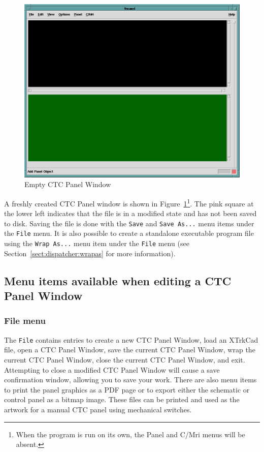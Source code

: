 \begin{figure}[hbpt]
\begin{centering}
\includegraphics[width=5in]{DISPEmptyCTCPanel.png}
\caption{Empty CTC Panel Window}
\label{fig:dispatcher:emptyCTCPanel}
\end{centering}
\end{figure}
A freshly created CTC Panel window is shown in
Figure~\ref{fig:dispatcher:emptyCTCPanel}\footnote{When the program is
run on its own, the Panel and C/Mri menus will be absent.}. The pink
square at the lower left indicates that the file is in a modified state
and has not been saved to disk.  Saving the file is done with the
\verb=Save= and \verb=Save As...= menu items under the \verb=File= menu.
It is also possible to create a standalone executable program file using
the \verb=Wrap As...= menu item under the \verb=File= menu (see
Section~\ref{sect:dispatcher:wrapas} for more information).

\subsection{Menu items available when editing a CTC Panel Window}

\subsubsection{File menu}

The \verb=File= contains entries to create a new CTC Panel Window, load
an XTrkCad file, open a CTC Panel Window, save the current CTC Panel
Window, wrap the current CTC Panel Window, close the current CTC Panel
Window, and exit.  Attempting to close a modified CTC Panel Window will
cause a save confirmation window, allowing you to save your work. There
are also menu items to print the panel graphics as a PDF page or to
export either the schematic or control panel as a bitmap image.  These
files can be printed and used as the artwork for a manual CTC panel
using mechanical switches.

